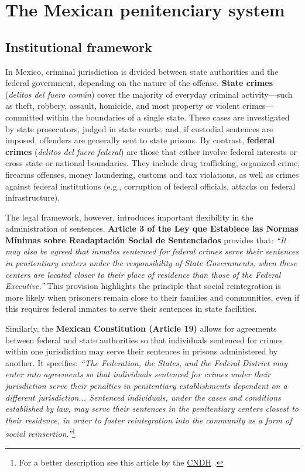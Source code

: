 \section{The Mexican penitenciary system}
\label{sec:back}

\subsection*{Institutional framework}

In Mexico, criminal jurisdiction is divided between state authorities and the federal government, depending on the nature of the offense. \textbf{State crimes} (\textit{delitos del fuero común}) cover the majority of everyday criminal activity—such as theft, robbery, assault, homicide, and most property or violent crimes—committed within the boundaries of a single state. These cases are investigated by state prosecutors, judged in state courts, and, if custodial sentences are imposed, offenders are generally sent to state prisons. By contrast, \textbf{federal crimes} (\textit{delitos del fuero federal}) are those that either involve federal interests or cross state or national boundaries. They include drug trafficking, organized crime, firearms offenses, money laundering, customs and tax violations, as well as crimes against federal institutions (e.g., corruption of federal officials, attacks on federal infrastructure).  

The legal framework, however, introduces important flexibility in the administration of sentences. \textbf{Article 3 of the Ley que Establece las Normas Mínimas sobre Readaptación Social de Sentenciados} provides that: \textit{“It may also be agreed that inmates sentenced for federal crimes serve their sentences in penitentiary centers under the responsibility of State Governments, when these centers are located closer to their place of residence than those of the Federal Executive.”} This provision highlights the principle that social reintegration is more likely when prisoners remain close to their families and communities, even if this requires federal inmates to serve their sentences in state facilities.  

Similarly, the \textbf{Mexican Constitution (Article 19)} allows for agreements between federal and state authorities so that individuals sentenced for crimes within one jurisdiction may serve their sentences in prisons administered by another. It specifies: \textit{“The Federation, the States, and the Federal District may enter into agreements so that individuals sentenced for crimes under their jurisdiction serve their penalties in penitentiary establishments dependent on a different jurisdiction... Sentenced individuals, under the cases and conditions established by law, may serve their sentences in the penitentiary centers closest to their residence, in order to foster reintegration into the community as a form of social reinsertion.”}\footnote{For a better description see this article by the \href{http://appweb.cndh.org.mx/biblioteca/archivos/pdfs/Clasificacion-penitenciaria.pdf}{CNDH} \citep{villanueva2016clasificacion}.}  

